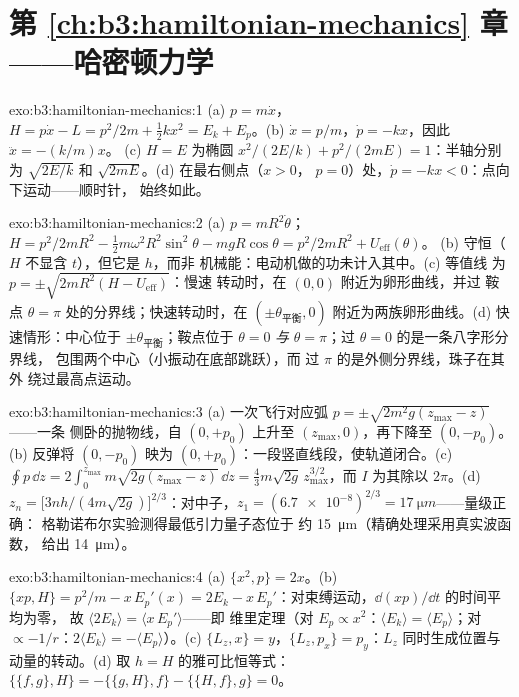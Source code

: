 \section*{第 \ref{ch:b3:hamiltonian-mechanics} 章——哈密顿力学}

\begin{solution}{exo:b3:hamiltonian-mechanics:1}
(a) $p = m\dot x$，$H = p\dot x - L = p^2/2m + \tfrac12 kx^2 = E_k +
E_p$。(b) $\dot x = p/m$，$\dot p = -kx$，因此 $\ddot x = -(k/m)x$。
(c) $H = E$ 为椭圆 $x^2/(2E/k) + p^2/(2mE) = 1$：半轴分别为
$\sqrt{2E/k}$ 和 $\sqrt{2mE}$。(d) 在最右侧点（$x > 0$，
$p = 0$）处，$\dot p = -kx < 0$：点向下运动——顺时针，
始终如此。
\end{solution}

\begin{solution}{exo:b3:hamiltonian-mechanics:2}
(a) $p = mR^2\dot\theta$；$H = p^2/2mR^2 - \tfrac12 m\omega^2R^2
\sin^2\theta - mgR\cos\theta = p^2/2mR^2 + U_{\text{eff}}(\theta)$。
(b) 守恒（$H$ 不显含 $t$），但它是 $h$，而非
机械能：电动机做的功未计入其中。(c) 等值线
为 $p = \pm\sqrt{2mR^2(H - U_{\text{eff}})}$：慢速
转动时，在 $(0, 0)$ 附近为卵形曲线，并过
鞍点 $\theta = \pi$ 处的分界线；快速转动时，在
$(\pm\theta_{\text{平衡}}, 0)$ 附近为两族卵形曲线。(d) 快速情形：中心位于
$\pm\theta_{\text{平衡}}$；鞍点位于 $\theta = 0$ \emph{与} $\theta =
\pi$；过 $\theta = 0$ 的是一条八字形分界线，
包围两个中心（小振动在底部跳跃），而
过 $\pi$ 的是外侧分界线，珠子在其外
绕过最高点运动。
\end{solution}

\begin{solution}{exo:b3:hamiltonian-mechanics:3}
(a) 一次飞行对应弧 $p = \pm\sqrt{2m^2g(z_{\max} - z)}$——一条
侧卧的抛物线，自 $(0, +p_0)$ 上升至
$(z_{\max}, 0)$，再下降至 $(0, -p_0)$。(b) 反弹将
$(0, -p_0)$ 映为 $(0, +p_0)$：一段竖直线段，使轨道闭合。(c)
$\oint p\,\dd z = 2\int_0^{z_{\max}}m\sqrt{2g(z_{\max} - z)}\,\dd z =
\tfrac43 m\sqrt{2g}\,z_{\max}^{3/2}$，而 $I$ 为其除以 $2\pi$。(d)
$z_n = \big[3nh/(4m\sqrt{2g})\big]^{2/3}$：对中子，$z_1 =
(\num{6.7e-8})^{2/3} = \qty{17}{\micro m}$——量级正确：
格勒诺布尔实验测得最低引力量子态位于
约 \qty{15}{\micro m}（精确处理采用真实波函数，
给出 \qty{14}{\micro m}）。
\end{solution}

\begin{solution}{exo:b3:hamiltonian-mechanics:4}
(a) $\{x^2, p\} = 2x$。(b) $\{xp, H\} = p^2/m - x\,E_p'(x) = 2E_k -
x\,E_p'$：对束缚运动，$\dd(xp)/\dd t$ 的时间平均为零，
故 $\langle 2E_k\rangle = \langle x\,E_p'\rangle$——即
维里定理（对 $E_p \propto x^2$：$\langle E_k\rangle = \langle
E_p\rangle$；对 $\propto -1/r$：$2\langle E_k\rangle = -\langle
E_p\rangle$）。(c) $\{L_z, x\} = y$，$\{L_z, p_x\} = p_y$：$L_z$
同时生成位置与动量的转动。(d) 取 $h
= H$ 的雅可比恒等式：$\{\{f, g\}, H\} = -\{\{g, H\}, f\} - \{\{H, f\}, g\} = 0$。
\end{solution}

